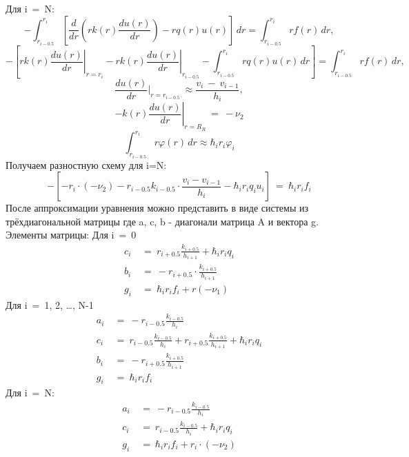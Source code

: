 Для i\ =\ N:
  \[-\int_{r_{i-0.5} }^{r_{i}} \left[\frac{d}{dr}\left(r k(r) \frac{du(r)}{dr}\right) -r q(r)u(r)\right]  \,dr = \int_{r_{i-0.5}}^{r_{i}} r f(r) \,dr, \]
  \[-\left[r k(r)\left.\frac{du(r)}{dr} \right\vert_{r=r_{i}} - r k(r) \left. \frac{du(r)}{dr}\right\vert_{r_{i-0.5}} - \int_{r_{i-0.5}}^{r_i} r q(r) u(r)  \,dr \right]
  = \int_{r_{i-0.5}}^{r_i} r f(r) \,dr, \]
  \[\frac{du(r)}{dr}\vert_{r = r_{i-0.5}}\ \approx \frac{v_{i}\ -\ v_{i-1}}{h_{i}}, \]
  \[-k(r)\left. \frac{du(r)}{dr} \right\vert_{r=R_R}\ =\ -\nu_2 \]
  \[\int_{r_{i-0.5}}^{r_i} r \varphi(r) \,dr \approx \hbar_i r_i \varphi_i \]
Получаем разностную схему для i=N:
\[
  -\left[ -r_i \cdot (-\nu_2) - r_{i-0.5}k_{i-0.5} \cdot \frac{v_i-v_{i-1}}{h_i}- \hbar_ir_iq_iu_i \right]\ =\ \hbar_ir_if_i
\]
После аппроксимации уравнения можно представить в виде системы из трёхдиагональной матрицы где a, c, b - диагонали матрица A и вектора g. Элементы матрицы:\newline
Для i\ =\ 0
\begin{align*}
  c_i\ &=\ r_{i+0.5}\frac{k_{i+0.5}}{h_{i+1}} + \hbar_ir_iq_i \\
  b_i\ &=\ -r_{i+0.5} \cdot \frac{k_{i+0.5}}{h_{i+1}} \\
  g_i\ &=\ \hbar_ir_if_i + r(-\nu_1)
\end{align*}
Для i\ =\ 1, 2, \dots, N-1
\begin{align*}
  a_i\ &=\ -r_{i-0.5}\frac{k_{i-0.5}}{h_i} \\
  c_i\ &=\ r_{i-0.5}\frac{k_{i-0.5}}{h_i} + r_{i+0.5}\frac{k_{i+0.5}}{h_{i+1}} + \hbar_i r_iq_i \\
  b_i\ &=\ -r_{i+0.5}\frac{k_{i+0.5}}{h_{i+1}} \\
  g_i\ &=\ \hbar_i r_i f_i
\end{align*}
Для i\ =\ N:
\begin{align*}
  a_i\ &=\ -r_{i-0.5}\frac{k_{i-0.5}}{h_i}\\
  c_i\ &=\ r_{i-0.5}\frac{k_{i-0.5}}{h_i} + \hbar_i r_iq_i \\
  g_i\ &=\ \hbar_i r_i f_i + r_i \cdot (-\nu_2)
\end{align*}

